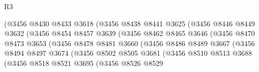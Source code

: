 \begin{lexlean}{R3}
\begin{coremodule}
                                (@3456
                                  @8430
                                  @8433
                                  @3618
                                  (@3456
                                    @8438
                                    @8441
                                    @3625
                                    (@3456
                                      @8446
                                      @8449
                                      @3632
                                      (@3456
                                        @8454
                                        @8457
                                        @3639
                                        (@3456
                                          @8462
                                          @8465
                                          @3646
                                          (@3456
                                            @8470
                                            @8473
                                            @3653
                                            (@3456
                                              @8478
                                              @8481
                                              @3660
                                              (@3456
                                                @8486
                                                @8489
                                                @3667
                                                (@3456
                                                  @8494
                                                  @8497
                                                  @3674
                                                  (@3456
                                                    @8502
                                                    @8505
                                                    @3681
                                                    (@3456
                                                      @8510
                                                      @8513
                                                      @3688
                                                      (@3456
                                                        @8518
                                                        @8521
                                                        @3695
                                                        (@3456
                                                          @8526
                                                          @8529

\end{coremodule}
\end{lexlean}
